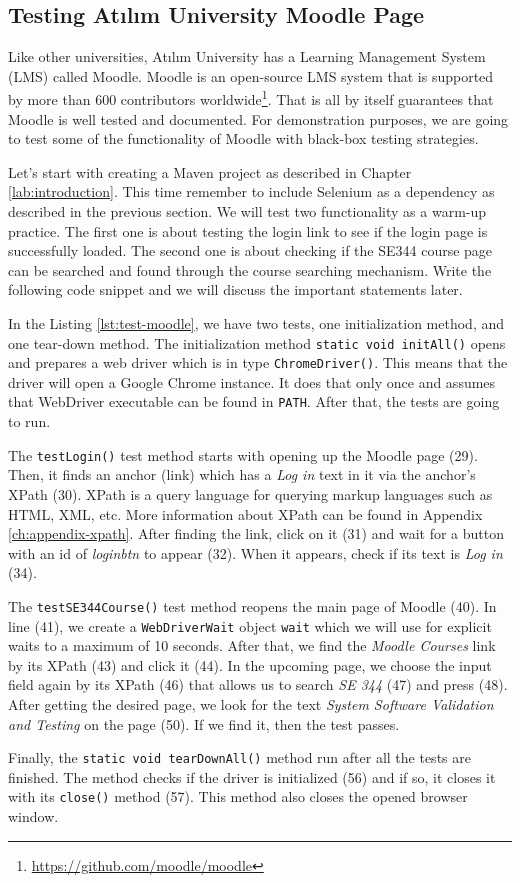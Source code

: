 \subsection{Testing Atılım University Moodle Page}
Like other universities, Atılım University has a Learning Management System (LMS) called Moodle. Moodle is an open-source LMS system that is supported by more than 600 contributors worldwide\footnote{\url{https://github.com/moodle/moodle}}. That is all by itself guarantees that Moodle is well tested and documented. For demonstration purposes, we are going to test some of the functionality of Moodle with black-box testing strategies.

Let's start with creating a Maven project as described in Chapter \ref{lab:introduction}. This time remember to include Selenium as a dependency as described in the previous section. We will test two functionality as a warm-up practice. The first one is about testing the login link to see if the login page is successfully loaded. The second one is about checking if the SE344 course page can be searched and found through the course searching mechanism. Write the following code snippet and we will discuss the important statements later.



In the Listing \ref{lst:test-moodle}, we have two tests, one initialization method, and one tear-down method. The initialization method \lstinline!static void initAll()! opens and prepares a web driver which is in type \lstinline!ChromeDriver()!. This means that the driver will open a Google Chrome instance. It does that only once and assumes that WebDriver executable can be found in \lstinline[language={}]!PATH!. After that, the tests are going to run.

The \lstinline!testLogin()! test method starts with opening up the Moodle page (29). Then, it finds an anchor (link) which has a \emph{Log in} text in it via the anchor's XPath (30). XPath is a query language for querying markup languages such as HTML, XML, etc. More information about XPath can be found in Appendix \ref{ch:appendix-xpath}. After finding the link, click on it (31) and wait for a button with an id of \emph{loginbtn} to appear (32). When it appears, check if its text is \emph{Log in} (34).

The \lstinline!testSE344Course()! test method reopens the main page of Moodle (40). In line (41), we create a \lstinline!WebDriverWait! object \lstinline!wait! which we will use for explicit waits to a maximum of 10 seconds. After that, we find the \emph{Moodle Courses} link by its XPath (43) and click it (44). In the upcoming page, we choose the input field again by its XPath (46) that allows us to search \emph{SE 344} (47) and press \keys{\return} (48). After getting the desired page, we look for the text \emph{System Software Validation and Testing} on the page (50). If we find it, then the test passes.

Finally, the \lstinline!static void tearDownAll()! method run after all the tests are finished. The method checks if the driver is initialized (56) and if so, it closes it with its \lstinline!close()! method (57). This method also closes the opened browser window.
